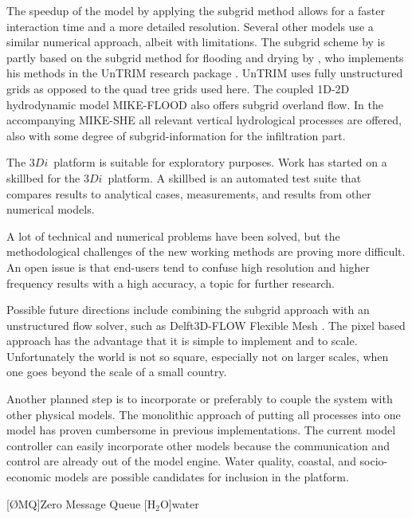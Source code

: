 \documentclass[a4paper]{article}
\DeclareRobustCommand{\threedi}{$3Di$~}
\begin{document}
The speedup of the model by applying the subgrid method allows for a faster interaction time and a more detailed resolution.
Several other models use a similar numerical approach, albeit with limitations. The subgrid scheme by \citet{Stelling2012} is partly based on the subgrid method for flooding and drying by \citet{Casulli2009}, who implements his methods in the UnTRIM research package \citet{Casulli2000}. UnTRIM uses fully unstructured grids as opposed to the quad tree grids used here. The coupled 1D-2D hydrodynamic model MIKE-FLOOD \citep{Dhi2014} also offers subgrid overland flow. In the accompanying MIKE-SHE all relevant vertical hydrological processes are offered, also with some degree of subgrid-information for the infiltration part.

The \threedi platform is suitable for exploratory purposes. Work has started on a skillbed for the \threedi platform. A skillbed is an automated test suite that compares results to analytical cases, measurements, and results from other numerical models.

A lot of technical and numerical problems have been solved, but the methodological challenges of the new working methods are proving more difficult. An open issue is that end-users tend to confuse high resolution and higher frequency results with a high accuracy, a topic for further research.

Possible future directions include combining the subgrid approach with an unstructured flow solver, such as Delft3D-FLOW Flexible Mesh \citep{Kernkamp2011}. The pixel based approach has the advantage that it is simple to implement and to scale. Unfortunately the world is not so square, especially not on larger scales, when one goes beyond the scale of a small country.

Another planned step is to incorporate or preferably to couple the system with other physical models. The monolithic approach of putting all processes into one model has proven cumbersome in previous implementations. The current model controller can easily incorporate other models because the communication and control are already out of the model engine. Water quality, coastal, and socio-economic models are possible candidates for inclusion in the platform.




\begin{acronym}[AAAAA]
  [\O{}MQ]{Zero Message Queue}
  [$\mathrm{H_2O}$]{water}
\end{acronym}
\end{document}
